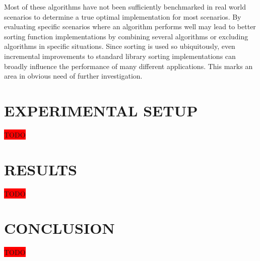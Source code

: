 \documentclass[letter, 12pt, conference]{ieeeconf}
\newcommand{\todo}{\colorbox{red}{TODO}}
\begin{document}
Most of these algorithms have not been sufficiently benchmarked in real world
scenarios to determine a true optimal implementation for most scenarios. By
evaluating specific scenarios where an algorithm performs well may lead to
better sorting function implementations by combining several algorithms or
excluding algorithms in specific situations. Since sorting is used so
ubiquitously, even incremental improvements to standard library sorting
implementations can broadly influence the performance of many different
applications. This marks an area in obvious need of further investigation.

\section{EXPERIMENTAL SETUP}

\todo

\section{RESULTS}

\todo

\section{CONCLUSION}

\todo



\printbibliography
\end{document}
